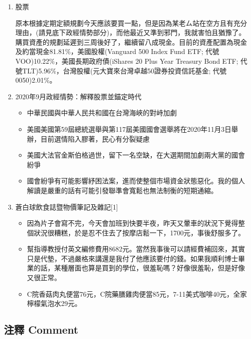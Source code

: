 \documentclass[
]{article}
\providecommand{\tightlist}{%
  \setlength{\itemsep}{0pt}\setlength{\parskip}{0pt}}
\begin{document}
\begin{enumerate}
\def\labelenumi{\arabic{enumi}.}
\item
  股票

  原本根據定期定額規劃今天應該要買一點，但是因為某老ㄙ站在空方且有充分理由，(請見底下政經情勢部分)，而他最近又準到邪門，我就害怕且猶豫了。購買資產的規劃延遲到三周後好了，繼續留八成現金。目前的資產配置為現金及約當現金81.81\%，美國股權(Vanguard
  500 Index Fund ETF; 代號VOO)10.22\%，美國長期政府債(iShares 20 Plus
  Year Treasury Bond ETF;
  代號TLT)5.96\%，台灣股權(元大寶來台灣卓越50證券投資信託基金;
  代號0050)2.01\%。
\item
  2020年9月政經情勢：解釋股票並錨定時代

  \begin{itemize}
  \tightlist
  \item
    中華民國與中華人民共和國在台灣海峽的對峙加劇
  \item
    美國美國第59屆總統選舉與第117屆美國國會選舉將在2020年11月3日舉辦，目前選情陷入膠著，民心有分裂疑慮
  \item
    美國大法官金斯伯格過世，留下一名空缺，在大選期間加劇兩大黨的國會紛爭
  \item
    國會紛爭有可能影響紓困法案，進而使整個市場資金狀態惡化。我的個人解讀是嚴重的話有可能引發聯準會寬鬆也無法制衡的短期通縮。
  \end{itemize}
\item
  蒼白球飲食誌暨物價筆記及雜記{[}1{]}

  \begin{itemize}
  \tightlist
  \item
    因為片子會寫不完，今天會加班到快要半夜，昨天又暈車的狀況下覺得整個狀況很糟糕，於是忍不住去了按摩店鬆一下，1700元，事後舒服多了。
  \item
    幫指導教授付英文編修費用8682元。當然我事後可以請經費補回來，其實只是代墊，不過嚴格來講還是我付了他應該要付的錢。如果我順利博士畢業的話，某種層面也算是買到的學位，很羞恥嗎？好像很羞恥，但是好像又很正常。
  \item
    C院香菇肉丸便當76元，C院藥膳雞肉便當85元，7-11美式咖啡40元，全家檸檬氣泡水29元。
  \end{itemize}
\end{enumerate}

\hypertarget{ux6ce8ux91cb-comment-21}{%
\subsection{注釋 Comment}\label{ux6ce8ux91cb-comment-21}}
\end{document}
